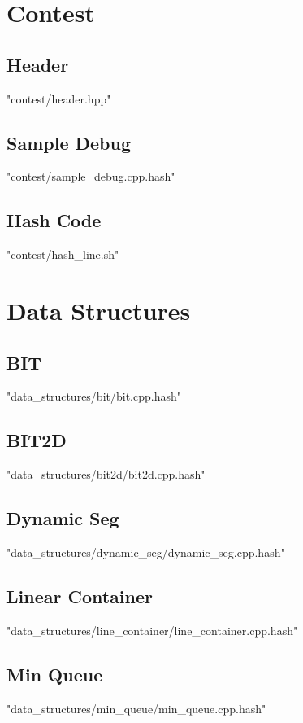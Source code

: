\documentclass [12pt,onecolumn,oneside]{article}
\begin{document}
\pagestyle{fancy}
\fancyfoot{}
\fancyhead[R]{\thepage}
\renewcommand{\headrulewidth}{0.4pt}
\tableofcontents
\scriptsize

\bigskip

\newpage
\section{Contest}
\subsection{ Header}
 {"contest/header.hpp"}
\subsection{ Sample Debug}
 {"contest/sample_debug.cpp.hash"}
\subsection{ Hash Code}
 {"contest/hash_line.sh"}
\newpage


\section{Data Structures}
\subsection{ BIT}
 {"data_structures/bit/bit.cpp.hash"}
\subsection{ BIT2D}
 {"data_structures/bit2d/bit2d.cpp.hash"}
\subsection{ Dynamic Seg}
 {"data_structures/dynamic_seg/dynamic_seg.cpp.hash"}
\subsection{ Linear Container}
 {"data_structures/line_container/line_container.cpp.hash"}
\subsection{ Min Queue}
 {"data_structures/min_queue/min_queue.cpp.hash"}
\end{document}
